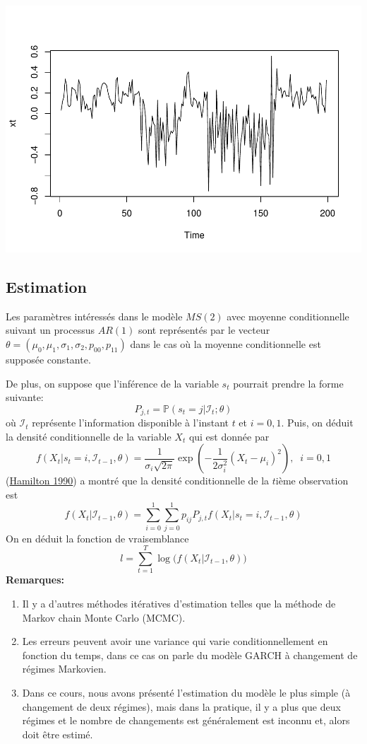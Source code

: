 \documentclass[
  french,
]{article}
\begin{document}
\includegraphics{Chap3_files/figure-latex/sim1-1.pdf}

\hypertarget{estimation}{%
\subsection{Estimation}\label{estimation}}

Les paramètres intéressés dans le modèle \(MS(2)\) avec moyenne
conditionnelle suivant un processus \(AR(1)\) sont représentés par le
vecteur \(\theta=(\mu_0,\mu_1,\sigma_1,\sigma_2,p_{00},p_{11})\) dans le
cas où la moyenne conditionnelle est supposée constante.

De plus, on suppose que l'inférence de la variable \(s_t\) pourrait
prendre la forme suivante: \[
P_{j,t}=\mathbb{P}(s_t=j|\mathcal{I}_t;\theta)
\] où \(\mathcal{I}_t\) représente l'information disponible à l'instant
\(t\) et \(i=0,1\). Puis, on déduit la densité conditionnelle de la
variable \(X_t\) qui est donnée par \[
f(X_t|s_t=i, \mathcal{I}_{t-1},\theta)=\dfrac{1}{\sigma_i\sqrt{2\pi}}\exp\left(-\dfrac{1}{2\sigma_i^2}(X_t-\mu_i)^2\right),\;\;i=0,1
\] (\protect\hyperlink{ref-hamilton90}{Hamilton 1990}) a montré que la
densité conditionnelle de la \(t\)ième observation est \[
f(X_t| \mathcal{I}_{t-1},\theta)=\sum_{i=0}^1\sum_{j=0}^1p_{ij}P_{j,t}f(X_t|s_t=i, \mathcal{I}_{t-1},\theta)
\] On en déduit la fonction de vraisemblance \[
l=\sum_{t=1}^T\log\Big(f(X_t| \mathcal{I}_{t-1},\theta)\Big)
\] \textbf{Remarques:}

\begin{enumerate}
\def\labelenumi{\arabic{enumi})}
\item
  Il y a d'autres méthodes itératives d'estimation telles que la méthode
  de Markov chain Monte Carlo (MCMC).
\item
  Les erreurs peuvent avoir une variance qui varie conditionnellement en
  fonction du temps, dans ce cas on parle du modèle GARCH à changement
  de régimes Markovien.
\item
  Dans ce cours, nous avons présenté l'estimation du modèle le plus
  simple (à changement de deux régimes), mais dans la pratique, il y a
  plus que deux régimes et le nombre de changements est généralement est
  inconnu et, alors doit être estimé.
\end{enumerate}
\end{document}
